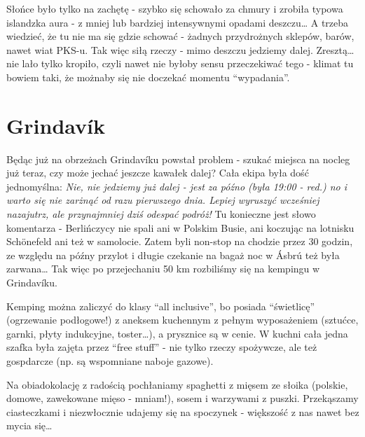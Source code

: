 Słońce było tylko na zachętę - szybko się schowało za chmury i zrobiła typowa islandzka aura - z mniej lub bardziej intensywnymi opadami deszczu… A trzeba wiedzieć, że tu nie ma się gdzie schować - żadnych przydrożnych sklepów, barów, nawet wiat PKS-u. Tak więc siłą rzeczy - mimo deszczu jedziemy dalej. Zresztą… nie lało tylko kropiło, czyli nawet nie byłoby sensu przeczekiwać tego - klimat tu bowiem taki, że możnaby się nie doczekać momentu “wypadania”.

\section*{Grindavík}

Będąc już na obrzeżach Grindavíku powstał problem - szukać miejsca na nocleg już teraz, czy może jechać jeszcze kawałek dalej? Cała ekipa była dość jednomyślna: \emph{Nie, nie jedziemy już dalej - jest za późno (była 19:00 - red.) no i warto się nie zarżnąć od razu pierwszego dnia. Lepiej wyruszyć wcześniej nazajutrz, ale przynajmniej dziś odespać podróż!} Tu konieczne jest słowo komentarza - Berlińczycy nie spali ani w Polskim Busie, ani koczując na lotnisku Schönefeld ani też w samolocie. Zatem byli non-stop na chodzie przez 30 godzin, ze względu na późny przylot i długie czekanie na bagaż noc w Ásbrú też była zarwana… Tak więc po przejechaniu 50 km rozbiliśmy się na kempingu w Grindavíku.

Kemping można zaliczyć do klasy “all inclusive”, bo posiada “świetlicę” (ogrzewanie podłogowe!) z aneksem kuchennym z pełnym wyposażeniem (sztućce, garnki, płyty indukcyjne, toster…), a prysznice są w cenie. W kuchni cała jedna szafka była zajęta przez “free stuff” - nie tylko rzeczy spożywcze, ale też gospdarcze (np. są wspomniane naboje gazowe).



Na obiadokolację z radością pochłaniamy spaghetti z mięsem ze słoika (polskie, domowe, zawekowane mięso - mniam!), sosem i warzywami z puszki. Przekąszamy ciasteczkami i niezwłocznie udajemy się na spoczynek - większość z nas nawet bez mycia się…

